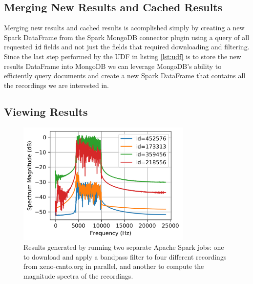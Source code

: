 \documentclass[conference,twoside]{IEEEtran}
\newcommand{\code}[1]{\texttt{#1}}
\begin{document}
\subsection{Merging New Results and Cached Results}
Merging new results and cached results is acomplished simply by creating a new Spark DataFrame from the Spark MongoDB connector plugin using a query of all requested \code{id} fields and not just the fields that required downloading and filtering. Since the last step performed by the UDF in listing \ref{lst:udf} is to store the new results DataFrame into MongoDB we can leverage MongoDB's ability to efficiently query documents and create a new Spark DataFrame that contains all the recordings we are interested in.

\subsection{Viewing Results}
\begin{figure}
  \centering
  \includegraphics[width=3.4in]{output_spectrum}
  \caption{Results generated by running two separate Apache Spark jobs: one to download and apply a bandpass filter to four different recordings from xeno-canto.org in parallel, and another to compute the magnitude spectra of the recordings.}
  \label{fig:spectra}
\end{figure}
\end{document}
